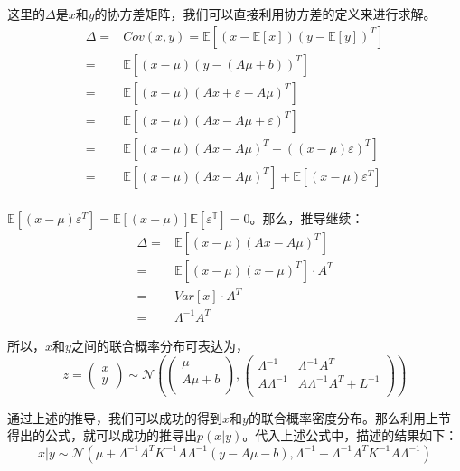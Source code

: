 \documentclass[a4paper]{article}
\numberwithin{equation}{section}
\begin{document}
这里的$\Delta$是$x$和$y$的协方差矩阵，我们可以直接利用协方差的定义来进行求解。
\begin{equation}
    \begin{split}
       \Delta = & Cov(x,y)= \mathbb{E}[(x-\mathbb{E}[x])(y-\mathbb{E}[y])^T]  \\
       = & \mathbb{E}[(x-\mu)(y-(A\mu + b))^T] \\
       = & \mathbb{E}[(x-\mu)(Ax+\varepsilon-A\mu)^T] \\
       = & \mathbb{E}[(x-\mu)(Ax-A\mu+\varepsilon)^T] \\
       = & \mathbb{E}[(x-\mu)(Ax-A\mu)^T+((x-\mu)\varepsilon)^T] \\
       = & \mathbb{E}[(x-\mu)(Ax-A\mu)^T]+\mathbb{E}[(x-\mu)\varepsilon^T] \\
  \end{split}
\end{equation}

$\mathbb{E}[(x-\mu)\varepsilon^T]=\mathbb{E}[(x-\mu)]\mathbb{E[\varepsilon^T]}=0$。那么，推导继续：
\begin{equation}
    \begin{split}
       \Delta
       = & \mathbb{E}[(x-\mu)(Ax-A\mu)^T] \\
       = & \mathbb{E}[(x-\mu)(x-\mu)^T]\cdot A^T \\
       = & Var[x]\cdot A^T \\
       = & \Lambda^{-1} A^T
  \end{split}
\end{equation}

所以，$x$和$y$之间的联合概率分布可表达为，
\begin{equation}
    z=
    \begin{pmatrix}
        x \\ 
        y
    \end{pmatrix} \sim
    \mathcal{N}
    \left(
    \begin{pmatrix}
        \mu \\
        A\mu + b \\
    \end{pmatrix}
    ,
    \begin{pmatrix}
        \Lambda^{-1} & \Lambda^{-1} A^T \\
        A\Lambda^{-1}  & A\Lambda^{-1}A^T +L^{-1} \\
    \end{pmatrix}
    \right)
\end{equation}

通过上述的推导，我们可以成功的得到$x$和$y$的联合概率密度分布。那么利用上节得出的公式，就可以成功的推导出$p(x|y)$。代入上述公式中，描述的结果如下：
\begin{equation}
    x|y\sim \mathcal{N}\left(\mu+\Lambda^{-1}A^TK^{-1}A\Lambda^{-1}\left(y-A\mu-b\right), \Lambda^{-1}-\Lambda^{-1}A^TK^{-1}A\Lambda^{-1}\right)
\end{equation}
\end{document}
